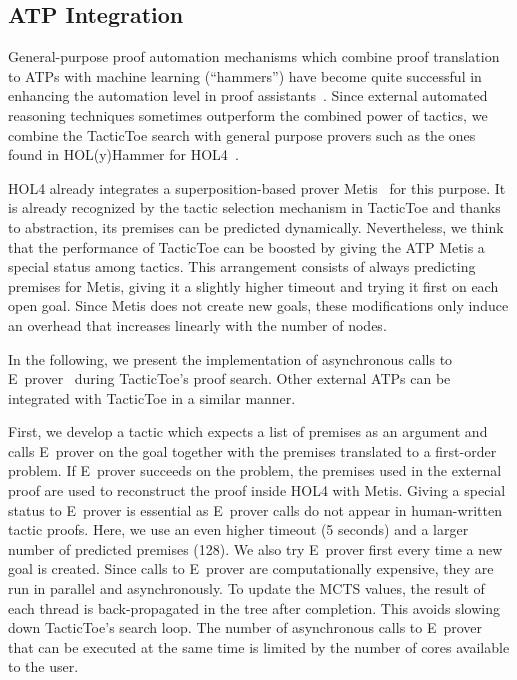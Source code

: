 \documentclass[runningheads,a4paper,draft]{svjour3}
\def\holfour{\textsf{HOL4}\xspace}
\def\eprover{\textsf{E~prover}\xspace}
\def\holyhammer{\textsf{HOL(y)Hammer}\xspace}
\def\metis{\textsf{Metis}\xspace}
\def\tactictoe{\textsf{TacticToe}\xspace}
\begin{document}
\subsection{ATP Integration}\label{sec:atp}
General-purpose proof automation mechanisms which combine proof translation to
ATPs with machine learning (``hammers'') have become quite successful in
enhancing the automation level in proof assistants~\cite{hammers4qed}.
Since external automated reasoning techniques sometimes outperform the combined
power of tactics, we combine the \tactictoe search with
general purpose provers such as the ones found in \holyhammer for
\holfour~\cite{tgck-cpp15}.

\holfour already integrates a superposition-based prover \metis~\cite{metis}
for this purpose. It is already
recognized by the tactic selection mechanism in \tactictoe and thanks to
abstraction, its
premises can be predicted dynamically. Nevertheless,
we think that the performance of \tactictoe can be boosted by giving the ATP
\metis a special status among tactics. This arrangement consists of always
predicting
premises for \metis, giving it a slightly higher timeout and
trying it first on each open goal. Since \metis does not create
new goals, these modifications only induce an overhead that increases linearly
with the number of nodes.

In the following, we present the implementation of asynchronous calls to
\eprover~\cite{eprover} during \tactictoe's proof search.
Other external ATPs can be integrated with \tactictoe in a similar manner.

First, we develop a tactic which expects a list of premises as an
argument and calls \eprover on the goal together with the premises translated
to a first-order problem. If \eprover
succeeds on the problem, the premises used in the external proof are used to
reconstruct the proof inside \holfour with \metis. Giving a special status
to \eprover is essential as \eprover calls do not appear in human-written
tactic proofs. Here, we use an even higher timeout (5 seconds) and
a larger number of predicted premises (128). We also try \eprover
first every time a new goal is created. Since calls to \eprover are
computationally expensive, they are run in parallel and asynchronously. To
update the MCTS values, the
result of each thread is back-propagated in the tree after completion. This
avoids slowing down \tactictoe's search loop. The number of asynchronous calls
to \eprover that can be executed at the same time is limited by the
number of cores available to the user.
\end{document}
